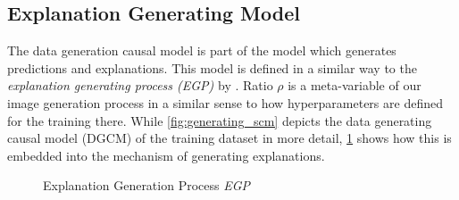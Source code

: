\subsection{Explanation Generating Model}
The data generation causal model is part of the model which generates predictions and explanations.
This model is defined in a similar way to the \textit{explanation generating process (EGP)} by \citet{Karimi2023}.
Ratio $\rho$ is a meta-variable of our image generation process in a similar sense to how hyperparameters are defined for the training there. While \cref{fig:generating_scm} depicts the data generating causal model (DGCM) of the training dataset in more detail, \cref{fig:egp} shows how this is embedded into the mechanism of generating explanations. 

\begin{figure}[t!]
    \centering
    \caption[Explanation Generation Process (EGP)]{Explanation Generation Process \textit{EGP}}
    \label{fig:egp}
\end{figure}

